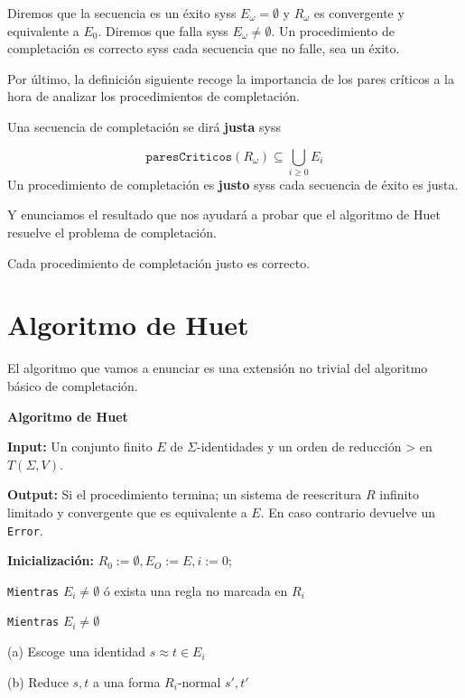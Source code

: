 Diremos que la secuencia es un éxito syss $E_\omega = \emptyset$ y
$R_\omega$ es convergente y equivalente a $E_0$. Diremos que falla
syss $E_\omega \not = \emptyset$. Un procedimiento de completación es
correcto syss cada secuencia que no falle, sea un éxito.

Por último, la definición siguiente recoge la importancia de los pares
críticos a la hora de analizar los procedimientos de completación.

\begin{defi}
  Una secuencia de completación se dirá \textbf{justa} syss

  \[
\texttt{paresCriticos}(R_\omega) \subseteq \bigcup_{i\geq 0} E_i
\]
Un procedimiento de completación es \textbf{justo} syss cada secuencia de éxito
es justa.
\end{defi}

Y enunciamos el resultado que nos ayudará a probar que el algoritmo de
Huet resuelve el problema de completación.

\begin{teor}
  Cada procedimiento de completación justo es correcto.
\end{teor}


\section{Algoritmo de Huet}

El algoritmo que vamos a enunciar es una extensión no trivial del
algoritmo básico de completación.

\textbf{Algoritmo de Huet} \hrulefill

\textbf{Input:} Un conjunto finito $E$ de $\Sigma$-identidades y un
orden de reducción > en $T(\Sigma, V)$.

\textbf{Output:} Si el procedimiento termina; un sistema de
reescritura $R$ infinito limitado y convergente que es equivalente a
$E$. En caso contrario devuelve un \texttt{Error}.

\textbf{Inicialización:}
$R_0 := \emptyset, E_O := E, i:= 0;$

\texttt{Mientras} $E_i \not = \emptyset$ ó exista una regla no marcada
en $R_i$

\hspace{0.5cm} \texttt{Mientras} $E_i \not = \emptyset$

\hspace{0.5cm} (a) Escoge una identidad $s \approx t \in E_i$

\hspace{0.5cm} (b) Reduce $s,t$ a una forma $R_i$-normal $s',t'$

